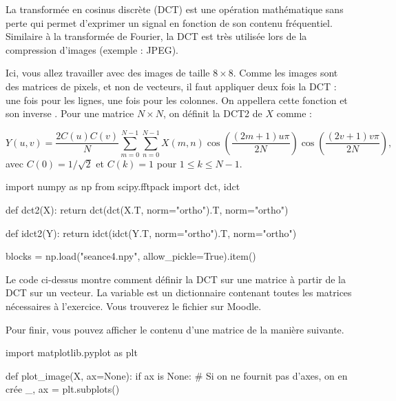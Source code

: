 \documentclass [a4paper, 11pt] {article}
\begin{document}
    \newpage
    \begin{exercice}{2}
    
        La transformée en cosinus discrète (DCT) est une opération mathématique sans perte qui permet d'exprimer un signal en fonction de son contenu fréquentiel. Similaire à la transformée de Fourier, la DCT est très utilisée lors de la compression d'images (exemple : JPEG).
        
        Ici, vous allez travailler avec des images de taille $8 \times 8$. Comme les images sont des matrices de pixels, et non de vecteurs, il faut appliquer deux fois la DCT : une fois pour les lignes, une fois pour les colonnes. On appellera cette fonction  et son inverse . Pour une matrice $N\times N$, on définit la DCT2 de $X$ comme :
        
        \begin{equation}
            Y(u,v) = \frac{2 C(u) C(v)}{N} \sum\limits_{m=0}^{N-1}\sum\limits_{n=0}^{N-1} X(m,n) \cos\left(\frac{(2m+1)u\pi}{2N}\right)\cos\left(\frac{(2v+1)v\pi}{2N}\right),
        \end{equation}
        avec $C(0)=1/\sqrt{2}$ et $C(k) = 1$ pour $1 \le k \le N-1$.
    
        \begin{python}
import numpy as np
from scipy.fftpack import dct, idct

def dct2(X):
    return dct(dct(X.T, norm="ortho").T, norm="ortho")

def idct2(Y):
    return idct(idct(Y.T, norm="ortho").T, norm="ortho")

blocks = np.load("seance4.npy", allow_pickle=True).item()
        \end{python}
        
        Le code ci-dessus montre comment définir la DCT sur une matrice à partir de la DCT sur un vecteur. La variable  est un dictionnaire contenant toutes les matrices nécessaires à l'exercice. Vous trouverez le fichier  sur Moodle.
        
        Pour finir, vous pouvez afficher le contenu d'une matrice de la manière suivante.
        
        \begin{python}
import matplotlib.pyplot as plt

def plot_image(X, ax=None):
    if ax is None:  # Si on ne fournit pas d'axes, on en crée
        _, ax = plt.subplots()


\end{python}
\end{exercice}
\end{document}
